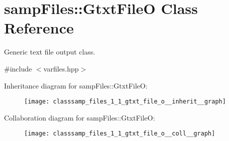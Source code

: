 \hypertarget{classsamp_files_1_1_gtxt_file_o}{}\section{samp\+Files\+:\+:Gtxt\+FileO Class Reference}
\label{classsamp_files_1_1_gtxt_file_o}


Generic text file output class.  




{\ttfamily \#include $<$varfiles.\+hpp$>$}



Inheritance diagram for samp\+Files\+:\+:Gtxt\+FileO\+:\nopagebreak
\begin{figure}[H]
\begin{center}
\leavevmode
\texttt{[image: classsamp\_files\_1\_1\_gtxt\_file\_o\_\_inherit\_\_graph]}
\end{center}
\end{figure}


Collaboration diagram for samp\+Files\+:\+:Gtxt\+FileO\+:\nopagebreak
\begin{figure}[H]
\begin{center}
\leavevmode
\texttt{[image: classsamp\_files\_1\_1\_gtxt\_file\_o\_\_coll\_\_graph]}
\end{center}
\end{figure}
